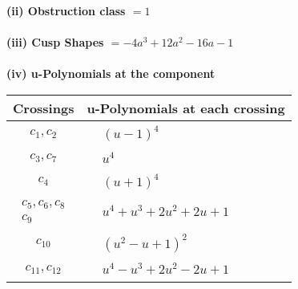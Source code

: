 \documentclass[1p]{elsarticle_modified}
\theoremstyle{definition}
\begin{document}
\flushleft \textbf{(ii) Obstruction class $= 1$}\\~\\
\flushleft \textbf{(iii) Cusp Shapes $= -4 a^3+12 a^2-16 a-1$}\\~\\
\newpage\renewcommand{\arraystretch}{1}
\flushleft \textbf{(iv) u-Polynomials at the component}\newline \\
\begin{tabular}{m{50pt}|m{274pt}}
Crossings & \hspace{64pt}u-Polynomials at each crossing \\
\hline $$\begin{aligned}c_{1},c_{2}\end{aligned}$$&$\begin{aligned}
&(u-1)^4
\end{aligned}$\\
\hline $$\begin{aligned}c_{3},c_{7}\end{aligned}$$&$\begin{aligned}
&u^4
\end{aligned}$\\
\hline $$\begin{aligned}c_{4}\end{aligned}$$&$\begin{aligned}
&(u+1)^4
\end{aligned}$\\
\hline $$\begin{aligned}c_{5},c_{6},c_{8}\\c_{9}\end{aligned}$$&$\begin{aligned}
&u^4+u^3+2 u^2+2 u+1
\end{aligned}$\\
\hline $$\begin{aligned}c_{10}\end{aligned}$$&$\begin{aligned}
&(u^2- u+1)^2
\end{aligned}$\\
\hline $$\begin{aligned}c_{11},c_{12}\end{aligned}$$&$\begin{aligned}
&u^4- u^3+2 u^2-2 u+1
\end{aligned}$\\
\hline
\end{tabular}\\~\\
\end{document}
